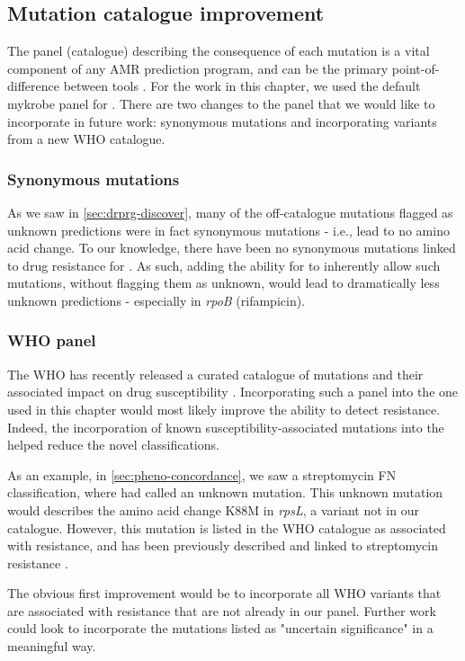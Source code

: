 \subsection{Mutation catalogue improvement}

The panel (catalogue) describing the consequence of each mutation is a vital component of any AMR prediction program, and can be the primary point-of-difference between tools \cite{hunt2019}. For the work in this chapter, we used the default mykrobe panel for \drprg{}. There are two changes to the \drprg{} panel that we would like to incorporate in future work: synonymous mutations and incorporating variants from a new WHO catalogue.

\subsubsection{Synonymous mutations}

As we saw in \autoref{sec:drprg-discover}, many of the off-catalogue mutations flagged as unknown predictions were in fact synonymous mutations - i.e., lead to no amino acid change. To our knowledge, there have been no synonymous mutations linked to drug resistance for \mtb{}. As such, adding the ability for \drprg{} to inherently allow such mutations, without flagging them as unknown, would lead to dramatically less unknown predictions - especially in \textit{rpoB} (rifampicin).

\subsubsection{WHO panel}
The WHO has recently released a curated catalogue of \mtb{} mutations and their associated impact on drug susceptibility \cite{whopanel2021}. Incorporating such a panel into the one used in this chapter would most likely improve the ability to detect resistance. Indeed, the incorporation of known susceptibility-associated mutations into the \drprg{} helped reduce the novel classifications.

As an example, in \autoref{sec:pheno-concordance}, we saw a streptomycin FN classification, where \drprg{} had called an unknown mutation. This unknown mutation would describes the amino acid change K88M in \textit{rpsL}, a variant not in our catalogue. However, this mutation is listed in the WHO catalogue as associated with resistance, and has been previously described and linked to streptomycin resistance \cite{Smittipat2016}.

The obvious first improvement would be to incorporate all WHO variants that are associated with resistance that are not already in our panel. Further work could look to incorporate the mutations listed as "uncertain significance" in a meaningful way.

